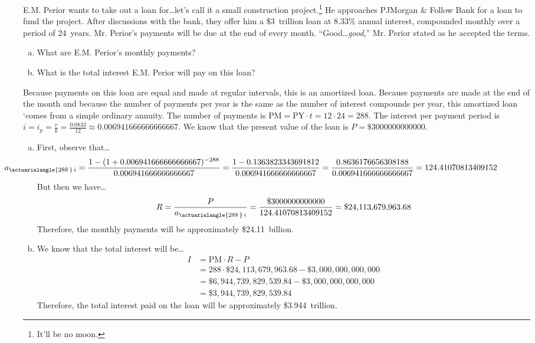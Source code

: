 \documentclass[11pt,letterpaper]{article}
\begin{document}

 E.M. Perior wants to take out a loan for\dots let's call it a small construction project.\footnote{It'll be no moon.} He approaches PJMorgan \& Follow Bank for a loan to fund the project. After discussions with the bank, they offer him a \$3~trillion loan at 8.33\% annual interest, compounded monthly over a period of 24~years. Mr. Perior's payments will be due at the end of every month. ``Good\dots \textit{good},'' Mr. Perior stated as he accepted the terms. 
	\begin{enumerate}[(a)]
	\item What are E.M. Perior's monthly payments?
	\item What is the total interest E.M. Perior will pay on this loan?
	\end{enumerate} \pspace

\sol Because payments on this loan are equal and made at regular intervals, this is an amortized loan. Because payments are made at the end of the month and because the number of payments per year is the same as the number of interest compounds per year, this amortized loan `comes from a simple ordinary annuity. The number of payments is $\text{PM}= \text{PY} \cdot t= 12 \cdot 24= 288$. The interest per payment period is $i= i_p= \frac{r}{k}= \frac{0.0833}{12} \approx 0.006941666666666667$. We know that the present value of the loan is $P= \$3000000000000$. 

\begin{enumerate}[(a)]
\item First, observe that\dots
	\[
	\hspace{-2.8cm} a_{\actuarialangle{288\,}\, i}= \dfrac{1 - (1 + 0.006941666666666667)^{-288}}{0.006941666666666667}= \dfrac{1 - 0.1363823343691812}{0.006941666666666667}= \dfrac{0.8636176656308188}{0.006941666666666667}= 124.41070813409152
	\]
But then we have\dots
	\[
	R= \dfrac{P}{a_{\actuarialangle{288\,}\, i}}= \dfrac{\$3000000000000}{124.41070813409152}= \$24,\!113,\!679,\!963.68
	\]
Therefore, the monthly payments will be approximately \$24.11~billion. \pspace

\item We know that the total interest will be\dots
	\[
	\begin{aligned}
	I&= \text{PM} \cdot R - P \\
	&= 288 \cdot \$24,\!113,\!679,\!963.68 - \$3,\!000,\!000,\!000,\!000 \\
	&= \$6,\!944,\!739,\!829,\!539.84 - \$3,\!000,\!000,\!000,\!000 \\
	&= \$3,\!944,\!739,\!829,\!539.84
	\end{aligned}
	\]
Therefore, the total interest paid on the loan will be approximately \$3.944~trillion. 
\end{enumerate}
\end{document}
